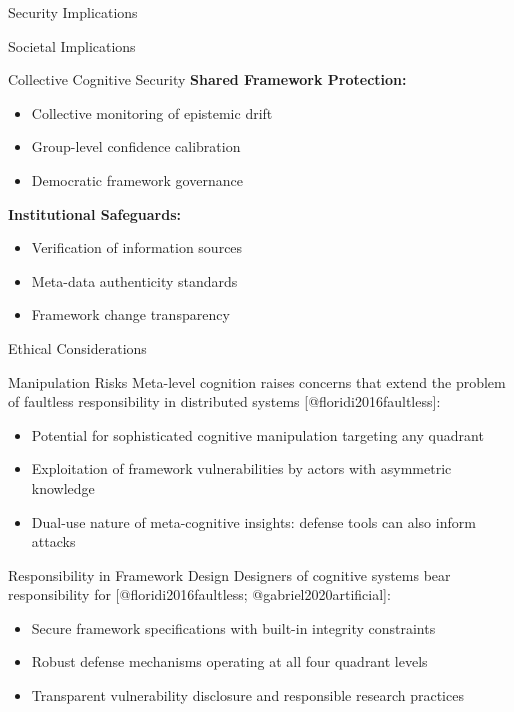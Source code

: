 \documentclass[
  ignorenonframetext,
]{beamer}
\providecommand{\tightlist}{%
  \setlength{\itemsep}{0pt}\setlength{\parskip}{0pt}}
\begin{document}
\begin{frame}{Security Implications}
\begin{block}{Societal Implications}
\begin{block}{Collective Cognitive Security}
\textbf{Shared Framework Protection:}

\begin{itemize}
\tightlist
\item
  Collective monitoring of epistemic drift
\item
  Group-level confidence calibration
\item
  Democratic framework governance
\end{itemize}

\textbf{Institutional Safeguards:}

\begin{itemize}
\tightlist
\item
  Verification of information sources
\item
  Meta-data authenticity standards
\item
  Framework change transparency
\end{itemize}
\end{block}
\end{block}

\begin{block}{Ethical Considerations}
\protect{}\label{sec:security_ethics}
\begin{block}{Manipulation Risks}
\protect{}\label{manipulation-risks}
Meta-level cognition raises concerns that extend the problem of
faultless responsibility in distributed systems
{[}@floridi2016faultless{]}:

\begin{itemize}
\tightlist
\item
  Potential for sophisticated cognitive manipulation targeting any
  quadrant
\item
  Exploitation of framework vulnerabilities by actors with asymmetric
  knowledge
\item
  Dual-use nature of meta-cognitive insights: defense tools can also
  inform attacks
\end{itemize}
\end{block}

\begin{block}{Responsibility in Framework Design}
\protect{}\label{responsibility-in-framework-design}
Designers of cognitive systems bear responsibility for
{[}@floridi2016faultless; @gabriel2020artificial{]}:

\begin{itemize}
\tightlist
\item
  Secure framework specifications with built-in integrity constraints
\item
  Robust defense mechanisms operating at all four quadrant levels
\item
  Transparent vulnerability disclosure and responsible research
  practices
\end{itemize}
\end{block}


\end{block}
\end{frame}
\end{document}
